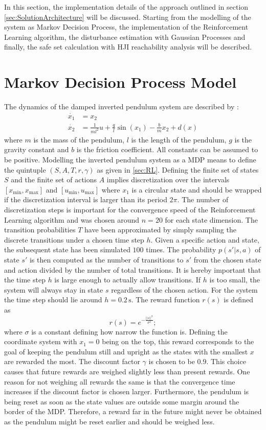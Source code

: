 \documentclass[../main.tex]{subfiles}
\begin{document}
In this section, the implementation details of the approach outlined in section \ref{sec:SolutionArchitecture} will be discussed. Starting from the modelling of the system as Markov Decision Process, the implementation of the Reinforcement Learning algorithm, the disturbance estimation with Gaussian Processes and finally, the safe set calculation with HJI reachability analysis will be described.
\section{Markov Decision Process Model}\label{sec:implementation_MDP}
The dynamics of the damped inverted pendulum system are described by \cite{doya2000reinforcement}:
\begin{align}
    \dot{x_1} &= x_2\\
    \dot{x_2} &= \frac{1}{ml^2}u+\frac{g}{l}\sin(x_1)-\frac{b}{m}x_2+d(x)
\end{align}
where $m$ is the mass of the pendulum, $l$ is the length of the pendulum, $g$ is the gravity constant and $b$ is the friction coefficient. All constants can be assumed to be positive. 
Modelling the inverted pendulum system as a MDP means to define the quintuple $(S,A,T,r,\gamma)$ as given in \ref{sec:RL}. Defining the finite set of states $S$ and the finite set of actions $A$ implies discretization over the intervals $[x_{\min}, x_{\max}]$ and $[u_{\min}, u_{\max}]$ where $x_1$ is a circular state and should be wrapped if the discretization interval is larger than its period $2\pi$. The number of discretization  steps is important for the convergence speed of the Reinforcement Learning algorithm and was chosen around $n = 20$ for each state dimension.
The transition probabilities $T$ have been approximated by simply sampling the discrete transitions under a chosen time step $h$. Given a specific action and state, the subsequent state has been simulated $100$ times. The probability $p(s'|s,a)$ of state $s'$ is then computed as the number of transitions to $s'$ from the chosen state and action divided by the number of total transitions. It is hereby important that the time step $h$ is large enough to actually allow transitions. If $h$ is too small, the system will always stay in state $s$ regardless of the chosen action. For the system the time step should lie around $h = 0.2\,\text{s}$. The reward function $r(s)$ is defined as
\begin{equation}
    r(s) = e^{-\frac{||s||^2}{\sigma^2}};
\end{equation}
where $\sigma$ is a constant defining how narrow the function is. Defining the coordinate system with $x_1 = 0$ being on the top, this reward corresponds to the goal of keeping the pendulum still and upright as the states with the smallest $x$ are rewarded the most. The discount factor $\gamma$ is chosen to be $0.9$. This choice causes that future rewards are weighed slightly less than present rewards. One reason for not weighing all rewards the same is that the convergence time increases if the discount factor is chosen larger. Furthermore, the pendulum is being reset as soon as the state values are outside some margin around the border of the MDP. Therefore, a reward far in the future might never be obtained as the pendulum might be reset earlier and should be weighed less.
\end{document}
